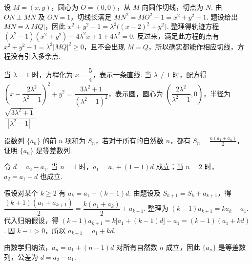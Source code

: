 \begin{solution}
设 \(M=(x,y)\)，圆心为 \(O=(0,0)\)，从 \(M\) 向圆作切线，切点为 \(N\). 由 \(ON\perp MN\) 及 \(ON=1\)，切线长满足 \(MN^2=MO^2-1=x^2+y^2-1\). 题设给出 \(MN=\lambda|MQ|\)，因此
\(x^2+y^2-1=\lambda^2\bigl((x-2)^2+y^2\bigr)\). 整理得轨迹方程
\((\lambda^2-1)(x^2+y^2)-4\lambda^2x+1+4\lambda^2=0\). 反过来，满足此方程的点有 \(x^2+y^2-1=\lambda^2|MQ|^2\geqslant0\)，且不会出现 \(M=Q\)，所以确实都能作相应切线，方程没有引入多余点.

当 \(\lambda=1\) 时，方程化为 \(x=\dfrac54\)，表示一条直线. 当 \(\lambda\neq1\) 时，配方得
\(\left(x-\dfrac{2\lambda^2}{\lambda^2-1}\right)^2+y^2=\dfrac{3\lambda^2+1}{(\lambda^2-1)^2}\)，表示圆，圆心为 \(\left(\dfrac{2\lambda^2}{\lambda^2-1},0\right)\)，半径为 \(\dfrac{\sqrt{3\lambda^2+1}}{|\lambda^2-1|}\).
\end{solution}

\begin{problem}
设数列 \(\{a_n\}\) 的前 \(n\) 项和为 \(S_n\)，若对于所有的自然数 \(n\)，都有 \(S_n = \frac{n(a_1 + a_n)}{2}\)，证明 \(\{a_n\}\) 是等差数列.
\end{problem}

\begin{solution}
令 \(d=a_2-a_1\). 当 \(n=1\) 时，\(a_1=a_1+(1-1)d\) 成立；当 \(n=2\) 时，\(a_2=a_1+d\) 也成立.

假设对某个 \(k\geqslant2\) 有 \(a_k=a_1+(k-1)d\). 由题设及 \(S_{k+1}=S_k+a_{k+1}\)，得
\(\dfrac{(k+1)(a_1+a_{k+1})}{2}=\dfrac{k(a_1+a_k)}{2}+a_{k+1}\). 整理为 \((k-1)a_{k+1}=ka_k-a_1\). 代入归纳假设，得
\((k-1)a_{k+1}=k\bigl[a_1+(k-1)d\bigr]-a_1=(k-1)(a_1+kd)\). 因 \(k-1>0\)，所以 \(a_{k+1}=a_1+kd\).

由数学归纳法，\(a_n=a_1+(n-1)d\) 对所有自然数 \(n\) 成立，因此 \(\{a_n\}\) 是等差数列，公差为 \(d=a_2-a_1\).
\end{solution}

